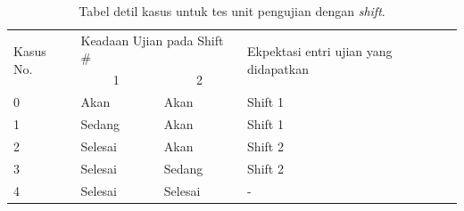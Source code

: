     \begin{table}[]
        \centering
        \begin{tabular}{|l|l|l|l|}
        \hline
        \multirow{2}{*}{Kasus No.} & \multicolumn{2}{l|}{Keadaan Ujian pada Shift \#} & \multirow{2}{*}{Ekpektasi entri ujian yang didapatkan} \\ \cline{2-3}
                             & \multicolumn{1}{c|}{1}  & \multicolumn{1}{c|}{2} &                                                        \\ \hline
        0                    & Akan                    & Akan                   & Shift 1                                                \\ \hline
        1                    & Sedang                  & Akan                   & Shift 1                                                \\ \hline
        2                    & Selesai                 & Akan                   & Shift 2                                                \\ \hline
        3                    & Selesai                 & Sedang                 & Shift 2                                                \\ \hline
        4                    & Selesai                 & Selesai                & -                                                      \\ \hline
        \end{tabular}
        \caption{Tabel detil kasus untuk tes unit pengujian dengan \textit{shift}. }
        \label{tab:exam-shift-tc}
    \end{table}
    
